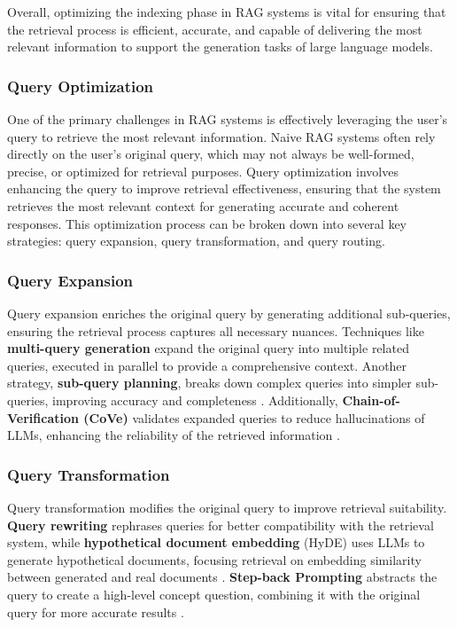 Overall, optimizing the indexing phase in RAG systems is vital for ensuring that the retrieval process is efficient, accurate, and capable of delivering the most relevant information to support the generation tasks of large language models.

\subsubsection{Query Optimization}

One of the primary challenges in RAG systems is effectively leveraging the user's query to retrieve the most relevant information. Naive RAG systems often rely directly on the user’s original query, which may not always be well-formed, precise, or optimized for retrieval purposes. Query optimization involves enhancing the query to improve retrieval effectiveness, ensuring that the system retrieves the most relevant context for generating accurate and coherent responses. This optimization process can be broken down into several key strategies: query expansion, query transformation, and query routing.

\subsubsection{Query Expansion}

Query expansion enriches the original query by generating additional sub-queries, ensuring the retrieval process captures all necessary nuances. Techniques like \textbf{multi-query generation} expand the original query into multiple related queries, executed in parallel to provide a comprehensive context. Another strategy, \textbf{sub-query planning}, breaks down complex queries into simpler sub-queries, improving accuracy and completeness \cite{zhou2022least}. Additionally, \textbf{Chain-of-Verification (CoVe)} validates expanded queries to reduce hallucinations of LLMs, enhancing the reliability of the retrieved information \cite{dhuliawala2023chain}.

\subsubsection{Query Transformation}

Query transformation modifies the original query to improve retrieval suitability. \textbf{Query rewriting} rephrases queries for better compatibility with the retrieval system, while \textbf{hypothetical document embedding} (HyDE) uses LLMs to generate hypothetical documents, focusing retrieval on embedding similarity between generated and real documents \cite{gao2022precise}. \textbf{Step-back Prompting} abstracts the query to create a high-level concept question, combining it with the original query for more accurate results \cite{zheng2023take}.

